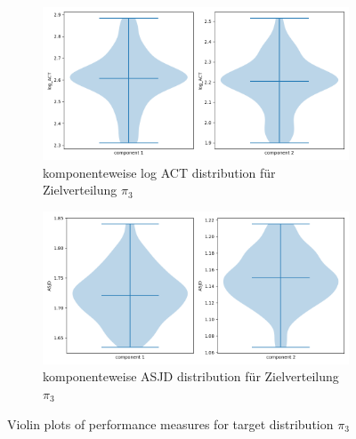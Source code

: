 \documentclass{scrartcl}
\begin{document}
    \begin{figure}
        \centering
        \begin{subfigure}{0.45\textheight}
              \centering
              \includegraphics[width=.8\linewidth]{../figs/log_ACT_pi_3.png}
              \caption{komponenteweise log ACT distribution für Zielverteilung $\pi_3$}
              \label{violin_plots_pi_3_act}
        \end{subfigure}
        \begin{subfigure}{0.45\textheight}
              \centering
              \includegraphics[width=.8\linewidth]{../figs/ASJD_pi_3.png}
              \caption{komponenteweise ASJD distribution für Zielverteilung $\pi_3$}
              \label{violin_plots_pi_3_asjd}
        \end{subfigure}
        \caption{Violin plots of performance measures for target distribution $\pi_3$}
        \label{violin_plots_pi_3}
    \end{figure}
\end{document}
